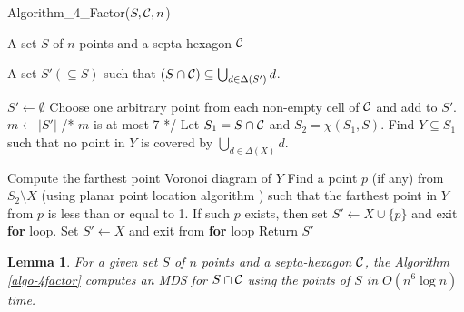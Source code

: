 \documentclass[a4paper,11pt]{article}
\newtheorem{lemma}{Lemma}
\begin{document}
\begin{algorithm}[!ht]
\caption{Algorithm\_4\_Factor($S, {\cal C}, n$)}
\begin{algorithmic}[1]
 A set $S$ of $n$ points and a septa-hexagon ${\cal C}$

 A set $S' (\subseteq S)$ such that $(S \cap {\cal C}) \subseteq \bigcup_{d \in \Delta(S')}d$. 

\STATE $S' \leftarrow \emptyset$
  \STATE Choose one arbitrary point from each non-empty cell of ${\cal C}$ and add to $S'$.
  \STATE $m \leftarrow |S'|$ /* $m$ is at most 7 */
  \STATE  Let $S_1 = S \cap {\cal C}$ and $S_2 = \chi(S_1, S)$. 
	  \STATE Find $Y \subseteq S_1$ such that no point in $Y$ is covered by $\bigcup_{d \in \Delta(X)}d$.
         
          \STATE Compute the farthest point Voronoi diagram of $Y$ \cite{BCKO08}
          \STATE Find a point $p$ (if any) from $S_2\setminus X$ (using planar point location algorithm \cite{PS09}) 
	    such that the farthest point in $Y$ from $p$ is less than or equal to 1. If such $p$ exists, then 
	    set $S' \leftarrow X \cup \{p\}$ and exit {\bf for} loop.
      \ENDFOR
    \ELSE
	  \STATE Set $S' \leftarrow X$ and exit from {\bf for} loop 
	\ENDIF
      \ENDFOR
    \ENDIF
  \ENDFOR
\ENDIF
\STATE Return $S'$
\end{algorithmic}
\label{algo-4factor}
\end{algorithm}


\begin{lemma} \label{lemma-3x}
For a given set $S$ of $n$ points and a septa-hexagon ${\cal C}$, the Algorithm \ref{algo-4factor} computes an 
MDS for $S \cap {\cal C}$ using the points of $S$ in $O(n^6 \log n)$ time.
\end{lemma}
\end{document}
